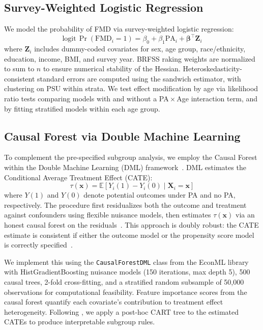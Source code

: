 \documentclass[11pt]{article}
\begin{document}
\subsection{Survey-Weighted Logistic Regression}

We model the probability of FMD via survey-weighted logistic regression:
\begin{equation}
\text{logit}\,\Pr(\text{FMD}_i = 1) = \beta_0 + \beta_1 \text{PA}_i + \boldsymbol{\beta}^\top \mathbf{Z}_i
\label{eq:logit}
\end{equation}
where $\mathbf{Z}_i$ includes dummy-coded covariates for sex, age group, race/ethnicity, education, income, BMI, and survey year.
BRFSS raking weights are normalized to sum to $n$ to ensure numerical stability of the Hessian.
Heteroskedasticity-consistent standard errors are computed using the sandwich estimator, with clustering on PSU within strata.
We test effect modification by age via likelihood ratio tests comparing models with and without a PA\,$\times$\,Age interaction term, and by fitting stratified models within each age group.

\subsection{Causal Forest via Double Machine Learning}
\label{sec:cf}

To complement the pre-specified subgroup analysis, we employ the Causal Forest within the Double Machine Learning (DML) framework~\citep{chernozhukov2018double,athey2019generalized}.
DML estimates the Conditional Average Treatment Effect (CATE):
\begin{equation}
\tau(\mathbf{x}) = \mathbb{E}\!\left[Y_i(1) - Y_i(0) \mid \mathbf{X}_i = \mathbf{x}\right]
\label{eq:cate}
\end{equation}
where $Y(1)$ and $Y(0)$ denote potential outcomes under PA and no PA, respectively.
The procedure first residualizes both the outcome and treatment against confounders using flexible nuisance models, then estimates $\tau(\mathbf{x})$ via an honest causal forest on the residuals~\citep{wager2018estimation}.
This approach is doubly robust: the CATE estimate is consistent if either the outcome model or the propensity score model is correctly specified~\citep{kennedy2023towards}.

We implement this using the \texttt{CausalForestDML} class from the EconML library~\citep{econml2019} with HistGradientBoosting nuisance models (150 iterations, max depth 5), 500 causal trees, 2-fold cross-fitting, and a stratified random subsample of 50,000 observations for computational feasibility.
Feature importance scores from the causal forest quantify each covariate's contribution to treatment effect heterogeneity.
Following \citet{sverdrup2025estimating}, we apply a post-hoc CART tree to the estimated CATEs to produce interpretable subgroup rules.
\end{document}
